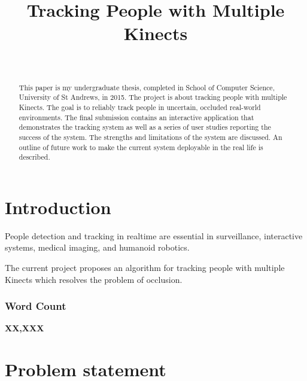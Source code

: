 \documentclass{sigchi}
\begin{document}
\title{Tracking People with Multiple Kinects}

\author{%
  \\
}

\maketitle

\begin{abstract}
This paper is my undergraduate thesis, completed in School of Computer Science, University of St Andrews, in 2015. The project is about tracking people with multiple Kinects. The goal is to reliably track people in uncertain, occluded real-world environments. The final submission contains an interactive application that demonstrates the tracking system as well as a series of user studies reporting the success of the system. The strengths and limitations of the system are discussed. An outline of future work to make the current system deployable in the real life is described.

\end{abstract}



\section{Introduction}
\label{sec:introduction}

People detection and tracking in realtime are essential in surveillance, interactive systems, medical imaging, and humanoid robotics.

The current project proposes an algorithm for tracking people with multiple Kinects which resolves the problem of occlusion.

\subsubsection{Word Count}

\textbf{XX,XXX}

\section{Problem statement}
\label{sec:problem_statement}
\end{document}
